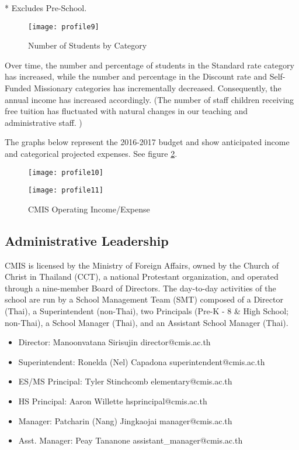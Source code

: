 * Excludes Pre-School.  

\begin{figure}[H]
\centering
\texttt{[image: profile9]}
\caption{Number of Students by Category}
\label{figure:numstudentscat}
\end{figure}

Over time, the number and percentage of students in the Standard rate category has increased, while the number and percentage in the Discount rate and Self-Funded Missionary categories has incrementally decreased.  Consequently, the annual income has increased accordingly.  (The number of staff children receiving free tuition has fluctuated with natural changes in our teaching and administrative staff. )  
 

The graphs below represent the 2016-2017 budget and show anticipated income and categorical projected expenses. See figure \ref{figure:opincex}.  

\begin{figure}[H]
\centering
\begin{minipage}{0.5\textwidth}
\texttt{[image: profile10]}
\end{minipage}%
\begin{minipage}{0.5\textwidth}
\texttt{[image: profile11]}
\end{minipage}
\caption{CMIS Operating Income/Expense}
\label{figure:opincex}
\end{figure}


\subsection{Administrative Leadership}

CMIS is licensed by the Ministry of Foreign Affairs, owned by the Church of Christ in Thailand (CCT), a national Protestant organization, and operated through a nine-member Board of Directors.  The day-to-day activities of the school are run by a School Management Team (SMT) composed of a Director (Thai), a Superintendent (non-Thai), two Principals (Pre-K - 8 \& High School; non-Thai), a School Manager (Thai), and an Assistant School Manager (Thai). 

\begin{itemize}
\item Director:  Manoonvatana Sirisujin         		director@cmis.ac.th
\item Superintendent:  Ronelda (Nel) Capadona	superintendent@cmis.ac.th
\item ES/MS Principal:  Tyler Stinchcomb	     	elementary@cmis.ac.th
\item HS Principal:  Aaron Willette		   	hsprincipal@cmis.ac.th	
\item Manager:  Patcharin (Nang) Jingkaojai		manager@cmis.ac.th
\item Asst. Manager:  Peay Tananone			assistant\_manager@cmis.ac.th
\end{itemize}

